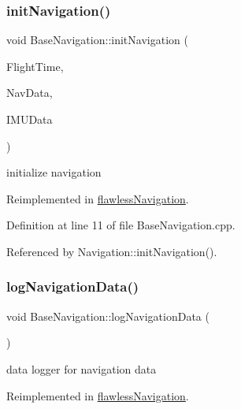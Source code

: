 \subsubsection{\texorpdfstring{init\+Navigation()}{initNavigation()}}
{\footnotesize\ttfamily void Base\+Navigation\+::init\+Navigation (\begin{DoxyParamCaption}\item[{\hyperlink{group___tools_ga3f1431cb9f76da10f59246d1d743dc2c}{Float64} \&}]{Flight\+Time,  }\item[{Navigation\+Struct \&}]{Nav\+Data,  }\item[{I\+M\+U\+Struct \&}]{I\+M\+U\+Data }\end{DoxyParamCaption})\hspace{0.3cm}{\ttfamily [virtual]}}



initialize navigation 



Reimplemented in \hyperlink{classflawless_navigation_a99e2e982cb7435cbb33533cce1941b39}{flawless\+Navigation}.



Definition at line 11 of file Base\+Navigation.\+cpp.



Referenced by Navigation\+::init\+Navigation().

\mbox{\label{class_base_navigation_ae6974b3c2fb26c03bbf0f2f26b1e9537}} 
\subsubsection{\texorpdfstring{log\+Navigation\+Data()}{logNavigationData()}}
{\footnotesize\ttfamily void Base\+Navigation\+::log\+Navigation\+Data (\begin{DoxyParamCaption}{ }\end{DoxyParamCaption})\hspace{0.3cm}{\ttfamily [virtual]}}



data logger for navigation data 



Reimplemented in \hyperlink{classflawless_navigation_a0c8ea43db88455be31576a4904f2711e}{flawless\+Navigation}.



